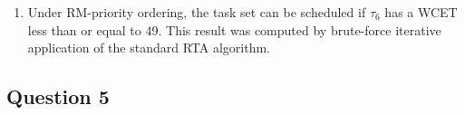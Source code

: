 \documentclass{article}
\numberwithin{equation}{section}
\numberwithin{table}{section}
\numberwithin{figure}{section}
\begin{document}
\begin{enumerate}
        Similarly to the RM case, the results were attained by manually
        dry-running the algorithm and verifying with the C++ implementation
        provided in \footnote{To switch the priority-ordering
        scheme, the \href{https://cppreference.com/cpp/container/set}{ordered
        set} was instantiated to use \texttt{DMTaskComparator} as opposed to
        \texttt{RMTaskComparator}.}.
    \item Under RM-priority ordering, the task set can be scheduled if $\tau_6$
        has a WCET less than or equal to 49. This result was computed by
        brute-force iterative application of the standard RTA algorithm.
\end{enumerate}

\subsection{Question 5}
\end{document}

